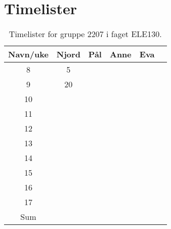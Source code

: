 \documentclass[main.tex]{subfiles}
\begin{document}
\chapter{Timelister}\label{ch:vedlegg_A}

\begin{table}[H]
    \centering
    \caption{Timelister for gruppe 2207 i faget ELE130.}
    \begin{tabular}{|c|c|c|c|c|c|}\hline
        Navn/uke & Njord & Pål & Anne & Eva \\\hline\hline
        8        & 5     &     &      &     \\\hline
        9        & 20    &     &      &     \\\hline
        10       &       &     &      &     \\\hline
        11       &       &     &      &     \\\hline
        12       &       &     &      &     \\\hline
        13       &       &     &      &     \\\hline
        14       &       &     &      &     \\\hline
        15       &       &     &      &     \\\hline
        16       &       &     &      &     \\\hline
        17       &       &     &      &     \\\hline\hline
        Sum      &       &     &      &     \\\hline
    \end{tabular}
    \label{tab:timeliste}
\end{table}
\end{document}
